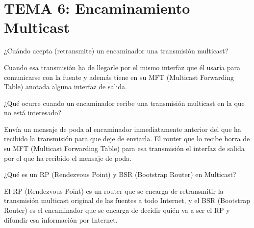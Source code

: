 \documentclass[]{article}
\begin{document}
\hypertarget{tema-6-encaminamiento-multicast}{%
\section{TEMA 6: Encaminamiento
Multicast}\label{tema-6-encaminamiento-multicast}}

¿Cuándo acepta (retransmite) un encaminador una transmisión multicast?

Cuando esa transmisión ha de llegarle por el mismo interfaz que él
usaría para comunicarse con la fuente y además tiene en su MFT
(Multicast Forwarding Table) anotada alguna interfaz de salida.

¿Qué ocurre cuando un encaminador recibe una transmisión multicast en la
que no está interesado?

Envía un mensaje de poda al encaminador inmediatamente anterior del que
ha recibido la transmisión para que deje de enviarla. El router que lo
recibe borra de su MFT (Multicast Forwarding Table) para esa transmisión
el interfaz de salida por el que ha recibido el mensaje de poda.

¿Qué es un RP (Rendezvous Point) y BSR (Bootstrap Router) en Multicast?

El RP (Rendezvous Point) es un router que se encarga de retransmitir la
transmisión multicast original de las fuentes a todo Internet, y el BSR
(Bootstrap Router) es el encaminador que se encarga de decidir quién va
a ser el RP y difundir esa información por Internet.
\end{document}
